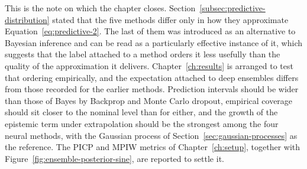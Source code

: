 This is the note on which the chapter closes.
Section~\ref{subsec:predictive-distribution} stated that the five methods differ
only in how they approximate Equation~\eqref{eq:predictive-2}. The last of them
was introduced as an alternative to Bayesian inference and can be read as a
particularly effective instance of it, which suggests that the label attached to
a method orders it less usefully than the quality of the approximation it
delivers. Chapter~\ref{ch:results} is arranged to test that ordering
empirically, and the expectation attached to deep ensembles differs from those
recorded for the earlier methods. Prediction intervals should be wider than
those of Bayes by Backprop and Monte Carlo dropout, empirical coverage should
sit closer to the nominal level than for either, and the growth of the epistemic
term under extrapolation should be the strongest among the four neural methods,
with the Gaussian process of Section~\ref{sec:gaussian-processes} as the
reference. The PICP and MPIW metrics of Chapter~\ref{ch:setup}, together with
Figure~\ref{fig:ensemble-posterior-sine}, are reported to settle it.
